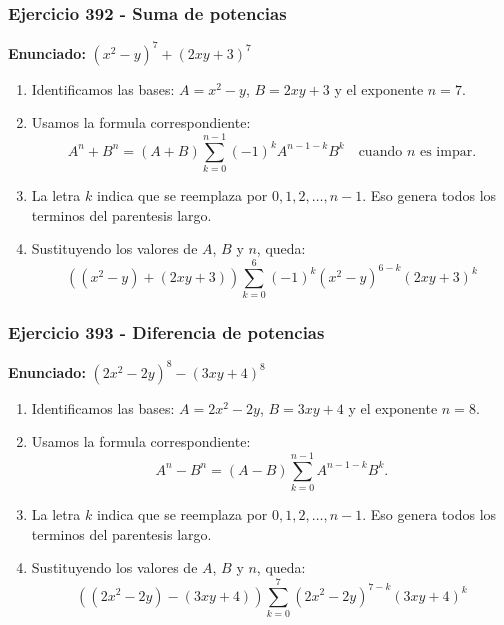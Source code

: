 \documentclass[11pt,a4paper]{article}
\begin{document}
\subsubsection*{Ejercicio 392 - Suma de potencias}
\textbf{Enunciado:} $ \left(x^{2} - y\right)^{7}+\left(2 x y + 3\right)^{7} $\par
\begin{enumerate}[leftmargin=2em]
\item Identificamos las bases: \(A=x^{2} - y\), \(B=2 x y + 3\) y el exponente \(n=7\).
\item Usamos la formula correspondiente: \[A^n+B^n=(A+B)\sum_{k=0}^{n-1}(-1)^kA^{n-1-k}B^k\quad\text{cuando }n\text{ es impar}.\]
\item La letra \(k\) indica que se reemplaza por \(0,1,2,\ldots,n-1\). Eso genera todos los terminos del parentesis largo.
\item Sustituyendo los valores de \(A\), \(B\) y \(n\), queda: \[\boxed{\left(\left(x^{2} - y\right)+\left(2 x y + 3\right)\right)\sum_{k=0}^{6}(-1)^k\left(x^{2} - y\right)^{6-k}\left(2 x y + 3\right)^k}\]
\end{enumerate}

\vspace{0.2cm}
\subsubsection*{Ejercicio 393 - Diferencia de potencias}
\textbf{Enunciado:} $ \left(2 x^{2} - 2 y\right)^{8}-\left(3 x y + 4\right)^{8} $\par
\begin{enumerate}[leftmargin=2em]
\item Identificamos las bases: \(A=2 x^{2} - 2 y\), \(B=3 x y + 4\) y el exponente \(n=8\).
\item Usamos la formula correspondiente: \[A^n-B^n=(A-B)\sum_{k=0}^{n-1}A^{n-1-k}B^k.\]
\item La letra \(k\) indica que se reemplaza por \(0,1,2,\ldots,n-1\). Eso genera todos los terminos del parentesis largo.
\item Sustituyendo los valores de \(A\), \(B\) y \(n\), queda: \[\boxed{\left(\left(2 x^{2} - 2 y\right)-\left(3 x y + 4\right)\right)\sum_{k=0}^{7}\left(2 x^{2} - 2 y\right)^{7-k}\left(3 x y + 4\right)^k}\]
\end{enumerate}

\vspace{0.2cm}
\end{document}
